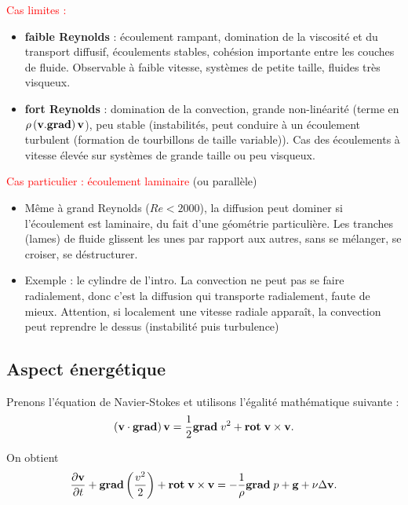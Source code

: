 \documentclass[11pt,a4paper]{report}
\begin{document}
\textcolor{red}{Cas limites :}
\begin{itemize}
	\item\textbf{faible Reynolds} : écoulement rampant, domination de la viscosité et du transport diffusif, écoulements stables, cohésion importante entre les couches de fluide.
	Observable à faible vitesse, systèmes de petite taille, fluides très visqueux.
	\item\textbf{fort Reynolds} : domination de la convection, grande non-linéarité (terme en $\rho\left(\bold{v}.\textbf{\text{grad}}\right)\bold{v}$), peu stable (instabilités, peut conduire à un écoulement turbulent (formation de tourbillons de taille variable)). 
	Cas des écoulements à vitesse élevée sur systèmes de grande taille ou peu visqueux.
\end{itemize}

\textcolor{red}{Cas particulier : écoulement laminaire} (ou parallèle)
\begin{itemize}
	\item Même à grand Reynolds ($Re < 2000$), la diffusion peut dominer si l'écoulement est laminaire, du fait d'une géométrie particulière. 
	Les tranches (lames) de fluide glissent les unes par rapport aux autres, sans se mélanger, se croiser, se déstructurer.
	\item Exemple : le cylindre de l'intro. La convection ne peut pas se faire radialement, donc c'est la diffusion qui transporte radialement, faute de mieux.
	Attention, si localement une vitesse radiale apparaît, la convection peut reprendre le dessus (instabilité puis turbulence)
\end{itemize}

\subsection{Aspect énergétique}\label{sec:2.3}

Prenons l'équation de Navier-Stokes et utilisons l'égalité mathématique suivante :
\begin{equation}
	\left(\bold{v}\cdot\textbf{grad}\right)\bold{v} = \frac{1}{2}\textbf{grad}\;v^2 + \textbf{rot}\;\bold{v}\times\bold{v}.
\end{equation}

On obtient
\begin{equation}
	\frac{\partial\bold{v}}{\partial t} +  \textbf{grad}\left(\frac{v^2}{2}\right) + \textbf{rot}\;\bold{v}\times\bold{v}
	= - \frac{1}{\rho}\textbf{grad}\;p + \bold{g} + \nu\Delta\bold{v}.
\end{equation}
\end{document}

